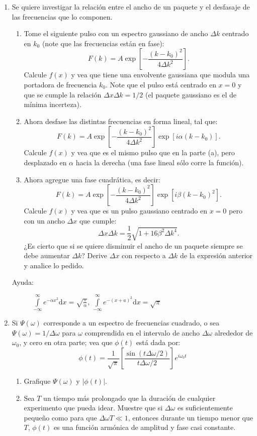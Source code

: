 \documentclass[11pt,spanish,a4paper]{article}
\begin{document}
\begin{enumerate}
\item Se quiere investigar la relación entre el ancho de un paquete y el
desfasaje de las frecuencias que lo componen.
\begin{enumerate}
	\item Tome el siguiente pulso con un espectro gaussiano de ancho $\Delta k$
centrado en $k_{0}$ (note que las frecuencias están en fase):
\[
F(k)=A\exp\left[-\frac{(k-k_{0})^{2}}{4\Delta k^{2}}\right].
\]
Calcule $f(x)$ y vea que tiene una envolvente gaussiana que modula
una portadora de frecuencia $k_{0}$. Note que el pulso está centrado
en $x=0$ y que se cumple la relación $\Delta x\Delta k=1/2$ (el
paquete gaussiano es el de mínima incerteza).
	\item Ahora desfase las distintas frecuencias en forma lineal, tal que:
\[
F(k)=A\exp\left[-\frac{(k-k_{0})^{2}}{4\Delta k^{2}}\right]\exp\left[i\alpha(k-k_{0})\right].
\]
Calcule $f(x)$ y vea que es el mismo pulso que en la parte (a), pero
desplazado en $\alpha$ hacia la derecha (una fase lineal sólo corre
la función).
	\item Ahora agregue una fase cuadrática, es decir:
\[
F(k)=A\exp\left[-\frac{(k-k_{0})^{2}}{4\Delta k^{2}}\right]\exp\left[i\beta(k-k_{0})^{2}\right].
\]
Calcule $f(x)$ y vea que es un pulso gaussiano centrado en $x=0$
pero con un ancho $\Delta x$ que cumple:
\[
\Delta x\Delta k=\frac{1}{2}\sqrt{1+16\beta^{2}\Delta k^{4}}.
\]
¿Es cierto que si se quiere disminuir el ancho de un paquete siempre
se debe aumentar $\Delta k$? Derive $\Delta x$ con respecto a $\Delta k$
de la expresión anterior y analice lo pedido.
\end{enumerate}
\begin{description}
	\item [{Ayuda:}] \( \int\limits_{-\infty}^{\infty} e^{-\alpha x^2} \mathrm{d}x = \sqrt{\frac{\pi}{\alpha} } \), \( \int\limits_{-\infty}^{\infty} e^{-(x+ a)^2} \mathrm{d}x = \sqrt{\pi}\)
\end{description}



\item Si $\Psi(\omega)$ corresponde a un espectro de frecuencias cuadrado,
o sea $\Psi(\omega)=1/\Delta\omega$ para $\omega$ comprendida en
el intervalo de ancho $\Delta\omega$ alrededor de $\omega_{0}$,
y cero en otra parte; vea que $\phi(t)$ está dada por:
\[
\phi(t)=\frac{1}{\sqrt{\pi}}\left[\frac{\sin(t\Delta\omega/2)}{t\Delta\omega/2}\right]e^{i\omega_{0}t}
\]
\begin{enumerate}
\item Grafique $\Psi(\omega)$ y $\left|\phi(t)\right|$.
\item Sea $T$ un tiempo más prolongado que la duración de cualquier experimento
que pueda idear.
Muestre que si $\Delta\omega$ es suficientemente pequeño como para que $\Delta\omega T\ll1$, entonces durante un tiempo menor que $T$, $\phi(t)$ es una función armónica de amplitud y fase casi constante.
\end{enumerate}



\end{enumerate}
\end{document}
